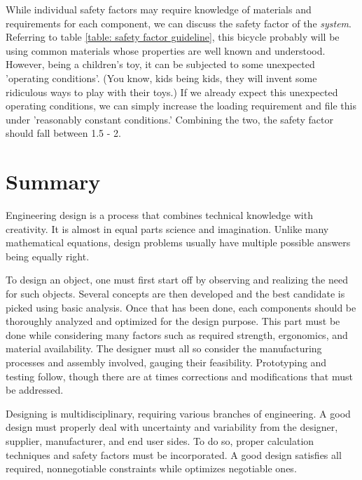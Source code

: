 \documentclass[a4paper,openany,12pt]{book}
\begin{document}
While individual safety factors may require knowledge of materials and
requirements for each component, we can discuss the safety factor of the
\emph{system}. Referring to table \ref{table: safety factor guideline},
this bicycle probably will be using common materials whose properties
are well known and understood. However, being a children's toy, it can
be subjected to some unexpected 'operating conditions'. (You know, kids
being kids, they will invent some ridiculous ways to play with their
toys.) If we already expect this unexpected operating conditions, we can
simply increase the loading requirement and file this under 'reasonably
constant conditions.' Combining the two, the safety factor should fall
between 1.5 - 2.

\section{Summary}
\label{summary}
Engineering design is a process that combines technical knowledge with
creativity. It is almost in equal parts science and imagination. Unlike
many mathematical equations, design problems usually have multiple
possible answers being equally right.

To design an object, one must first start off by observing and realizing
the need for such objects. Several concepts are then developed and the
best candidate is picked using basic analysis. Once that has been done,
each components should be thoroughly analyzed and optimized for the
design purpose. This part must be done while considering many factors
such as required strength, ergonomics, and material availability. The
designer must all so consider the manufacturing processes and assembly
involved, gauging their feasibility. Prototyping and testing follow,
though there are at times corrections and modifications that must be
addressed.

Designing is multidisciplinary, requiring various branches of
engineering. A good design must properly deal with uncertainty and
variability from the designer, supplier, manufacturer, and end user
sides. To do so, proper calculation techniques and safety factors must
be incorporated. A good design satisfies all required, nonnegotiable
constraints while optimizes negotiable ones.
\end{document}
